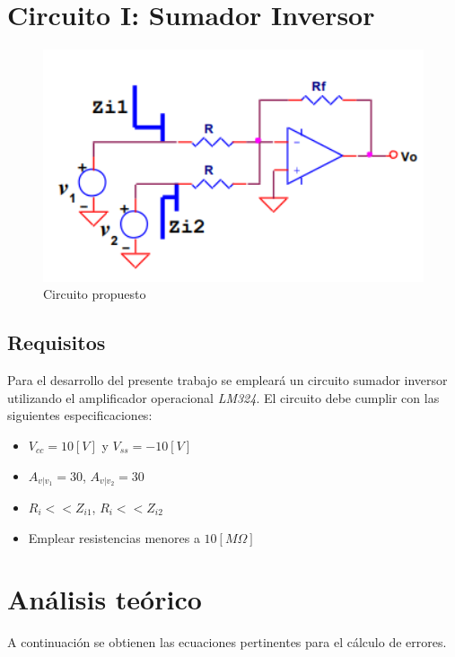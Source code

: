 \documentclass[11pt, a4paper]{article}
\begin{document}
\section{Circuito I: Sumador Inversor}
\begin{figure}[htb]
	\centering
	\includegraphics[width=1\textwidth]{Imagenes/Circuito1.png}
	\caption{Circuito propuesto}
\end{figure}
\subsection{Requisitos}
Para el desarrollo del presente trabajo se empleará un circuito sumador inversor utilizando el amplificador operacional \textit{LM324}. El circuito debe cumplir con las siguientes especificaciones:
\begin{itemize}
    \item $V_{cc}=10[V]$ y $V_{ss}=-10[V]$
    \item $A_{v|v_1}=30$, $A_{v|v_2}=30$
    \item $R_i<<Z_{i1}$, $R_i<<Z_{i2}$
    \item Emplear resistencias menores a $10[M\Omega]$
\end{itemize}

\newpage

\section{Análisis teórico}
A continuación se obtienen las ecuaciones pertinentes para el cálculo de errores.
\end{document}
